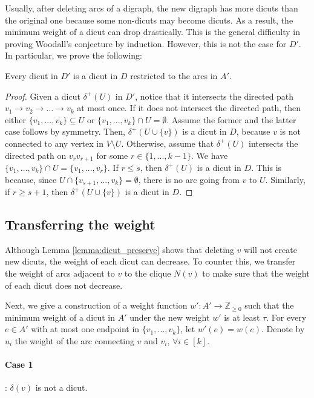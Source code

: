 \documentclass[runningheads]{llncs}
\newcommand{\Z}{\mathbb{Z}}
\begin{document}
     Usually, after deleting arcs of a digraph, the new digraph has more dicuts than the original one because some non-dicuts may become dicuts. As a result, the minimum weight of a dicut can drop drastically. This is the general difficulty in proving Woodall's conjecture by induction. However, this is not the case for $D'$. In particular, we prove the following:
\begin{lemma}\label{lemma:dicut_preserve}
    Every dicut in $D'$ is a dicut in $D$ restricted to the arcs in $A'$.
\end{lemma}
\begin{proof}
    Given a dicut $\delta^+(U)$ in $D'$, notice that it intersects the directed path $v_1\rightarrow v_2\rightarrow\ldots\rightarrow v_k$ at most once. If it does not intersect the directed path, then either $\{v_1,...,v_k\}\subseteq U$ or $\{v_1,...,v_k\}\cap U=\emptyset$. Assume the former and the latter case follows by symmetry. Then, $\delta^+(U\cup\{v\})$ is a dicut in $D$, because $v$ is not connected to any vertex in $V\setminus U$. Otherwise, assume that $\delta^+(U)$ intersects the directed path on $v_rv_{r+1}$ for some $r\in\{1,...,k-1\}$. 
    We have $\{v_1,...,v_k\}\cap U=\{v_1,...,v_r\}$.
    If $r\leq s$, then $\delta^+(U)$ is a dicut in $D$. This is because, since $U\cap \{v_{s+1},...,v_k\}=\emptyset$, there is no arc going from $v$ to $U$. Similarly, if $r\geq s+1$, then $\delta^+(U\cup\{v\})$ is a dicut in $D$.
\end{proof}
      
\subsection{Transferring the weight}
    Although Lemma \ref{lemma:dicut_preserve} shows that deleting $v$ will not create new dicuts, the weight of each dicut can decrease. To counter this, we transfer the weight of arcs adjacent to $v$ to the clique $N(v)$ to make sure that the weight of each dicut does not decrease.

    
    Next, we give a construction of a weight function $w':A'\rightarrow \Z_{\geq 0}$ such that the minimum weight of a dicut in $A'$ under the new weight $w'$ is at least $\tau$. For every $e\in A'$ with at most one endpoint in $\{v_1,...,v_k\}$, let $w'(e)=w(e)$. Denote by $u_i$ the weight of the arc connecting $v$ and $v_i$, $\forall i\in[k]$. 
    
    \paragraph{\textbf{Case 1}}: $\delta(v)$ is not a dicut.
    
\end{document}
